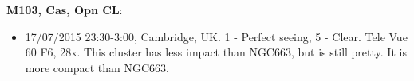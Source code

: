 {\bf M103, Cas, Opn CL}:
\begin{itemize}
\item 17/07/2015 23:30-3:00, Cambridge, UK. 1 - Perfect seeing, 5 - Clear. Tele Vue 60 F6, 28x. This cluster has less impact than NGC663, but is still pretty. It is more compact than NGC663.
\end{itemize}
